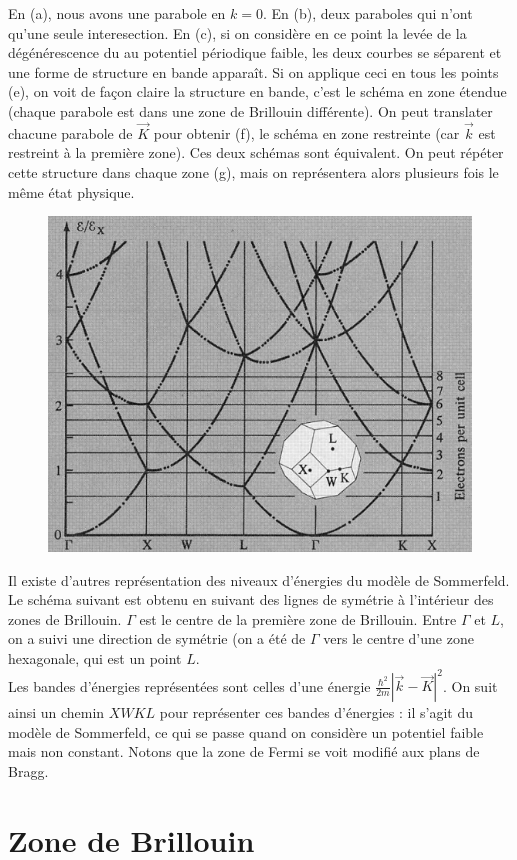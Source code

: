 	En (a), nous avons une parabole en $k=0$. En (b), deux paraboles qui n'ont qu'une 
	seule interesection. En (c), si on considère en ce point la levée de la dégénérescence 
	du au potentiel périodique faible, les deux courbes se séparent et une forme de 
	structure en bande apparaît. Si on applique ceci en tous les points (e), on voit de 
	façon claire la structure en bande, c'est le schéma en zone étendue (chaque parabole 
	est dans une zone de Brillouin différente). On peut translater chacune parabole de 
	$\vec{K}$ pour obtenir (f), le schéma en zone restreinte (car $\vec k$ est restreint 
	à la première zone). Ces deux schémas sont équivalent. On peut répéter cette structure 
	dans chaque zone (g), mais on représentera alors plusieurs fois le même état physique. 
	
	
	\newpage
	\begin{figure}
	\includegraphics[scale=0.4]{ch5/image4.png}
	\end{figure}
	
	Il existe d'autres représentation des niveaux d'énergies du modèle de Sommerfeld. Le 
	schéma suivant est obtenu en suivant des lignes de symétrie à l'intérieur des zones 
	de Brillouin. $\Gamma$ est le centre de la première zone de Brillouin. Entre $\Gamma$ 
	et $L$, on a suivi une direction de symétrie (on a été de $\Gamma$ vers le centre d'une 
	zone hexagonale, qui est un point $L$. \\
	Les bandes d'énergies représentées sont celles d'une énergie $\frac{\hbar^2}{2m}|\vec k
	-\vec K|^2$. On suit ainsi un chemin $XWKL$ pour représenter ces bandes d'énergies : 
	il s'agit du modèle de Sommerfeld, ce qui se passe quand on considère un potentiel faible 
	mais non constant.	Notons que la zone de Fermi se voit modifié aux plans de Bragg.
	
	\section{Zone de Brillouin}


	